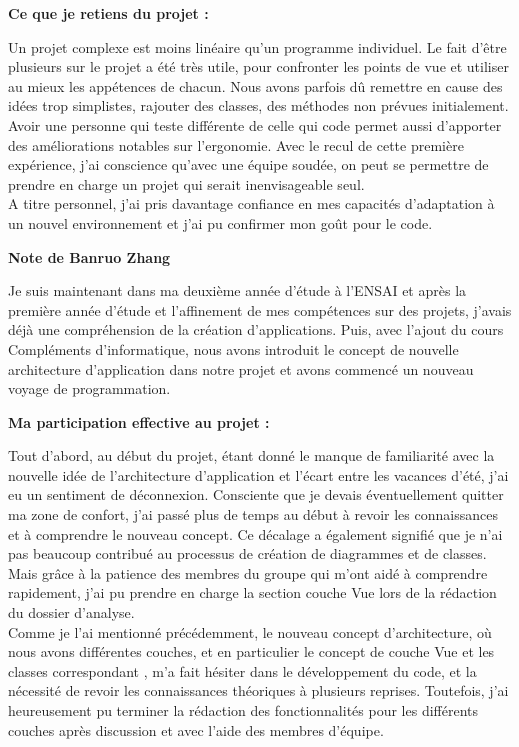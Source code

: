\documentclass[11pt]{article}
\begin{document}
\bigbreak
\textbf{ Ce que je retiens du projet :   }

Un projet complexe est moins linéaire qu'un programme individuel. Le fait d'être plusieurs sur le projet a été très utile, pour confronter les points de vue et utiliser au mieux les appétences de chacun. Nous avons parfois dû remettre en cause des idées trop simplistes, rajouter des classes, des méthodes non prévues initialement. Avoir une personne qui teste différente de celle qui code permet aussi d'apporter des améliorations notables sur l'ergonomie. Avec le recul de cette première expérience, j'ai conscience qu'avec une équipe soudée, on peut se permettre de prendre en charge un projet qui serait inenvisageable seul.\\

A titre personnel, j'ai pris davantage confiance en mes capacités d'adaptation à un nouvel environnement et j'ai pu confirmer mon goût pour le code.



\newpage
\textbf{\Large Note de Banruo Zhang}

Je suis maintenant dans ma deuxième année d'étude à l'ENSAI et après la première année d'étude et l'affinement de mes compétences sur des projets, j'avais déjà une compréhension de la création d'applications. Puis, avec l'ajout du cours Compléments d'informatique, nous avons introduit le concept de nouvelle architecture d'application dans notre projet et avons commencé un nouveau voyage de programmation.

\bigbreak
\textbf{ Ma participation effective au projet : }

Tout d'abord, au début du projet, étant donné le manque de familiarité avec la nouvelle idée de l'architecture d'application et l'écart entre les vacances d'été, j'ai eu un sentiment de déconnexion. Consciente que je devais éventuellement quitter ma zone de confort, j'ai passé plus de temps au début à revoir les connaissances et à comprendre le nouveau concept. Ce décalage a également signifié que je n'ai pas beaucoup contribué au processus de création de diagrammes et de classes. Mais grâce à la patience des membres du groupe qui m'ont aidé à comprendre rapidement, j'ai pu prendre en charge la section couche Vue lors de la rédaction du dossier d'analyse.\\

Comme je l'ai mentionné précédemment, le nouveau concept d'architecture, où nous avons différentes couches, et en particulier le concept de couche Vue et les classes correspondant , m'a fait hésiter dans le développement du code, et la nécessité de revoir les connaissances théoriques à plusieurs reprises. Toutefois, j'ai heureusement pu terminer la rédaction des fonctionnalités pour les différents couches après discussion et avec l'aide des membres d'équipe.\\
\end{document}
